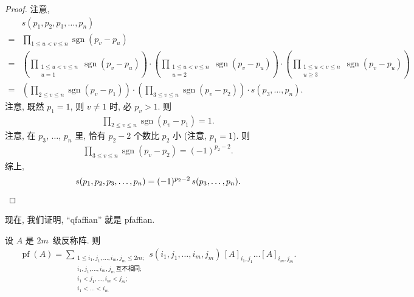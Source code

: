 \documentclass[../libro]{subfiles}
\begin{document}
\begin{proof}
    注意,
    \begin{align*}
             &
        s(p_1, p_2, p_3, \dots, p_n)
        \\
        = {} &
        \prod_{1 \leq u < v \leq n}
        {\operatorname{sgn} {(p_v - p_u)}}
        \\
        = {} &
        \left(
        \prod_{\substack{1 \leq u < v \leq n \\
                u = 1}}
        {\operatorname{sgn} {(p_v - p_u)}}
        \right)
        \cdot
        \left(
        \prod_{\substack{1 \leq u < v \leq n \\
                u = 2}}
        {\operatorname{sgn} {(p_v - p_u)}}
        \right)
        \cdot
        \left(
        \prod_{\substack{1 \leq u < v \leq n \\
                u \geq 3}}
        {\operatorname{sgn} {(p_v - p_u)}}
        \right)
        \\
        = {} &
        \left(
        \prod_{2 \leq v \leq n}
        {\operatorname{sgn} {(p_v - p_1)}}
        \right)
        \cdot
        \left(
        \prod_{3 \leq v \leq n}
        {\operatorname{sgn} {(p_v - p_2)}}
        \right)
        \cdot
        s(p_3, \dots, p_n).
    \end{align*}
    注意, 既然 \(p_1 = 1\),
    则 \(v \neq 1\) 时, 必 \(p_v > 1\).
    则
    \begin{align*}
        \prod_{2 \leq v \leq n}
        {\operatorname{sgn} {(p_v - p_1)}}
        = 1.
    \end{align*}
    注意, 在 \(p_3\), \(\dots\), \(p_n\) 里,
    恰有 \(p_2 - 2\) 个数比 \(p_2\) 小
    (注意, \(p_1 = 1\)).
    则
    \begin{align*}
        \prod_{3 \leq v \leq n}
        {\operatorname{sgn} {(p_v - p_2)}}
        = (-1)^{p_2 - 2}.
    \end{align*}
    综上,
    \begin{equation*}
        s(p_1, p_2, p_3, \dots, p_n)
        = (-1)^{p_2 - 2}\, s(p_3, \dots, p_n).
        \qedhere
    \end{equation*}
\end{proof}

现在, 我们证明, ``qfaffian'' 就是 pfaffian.

\begin{theorem}
    设 \(A\) 是 \(2m\)~级反称阵.
    则
    \begin{align*}
        \operatorname{pf} {(A)}
        = \sum_{\substack{
        1 \leq i_1, j_1, \dots, i_m, j_m \leq 2m; \\
        i_1, j_1, \dots, i_m, j_m\,\text{互不相同};   \\
        i_1 < j_1, \dots, i_m < j_m;              \\
                i_1 < \dots < i_m
            }}
        {s(i_1, j_1, \dots, i_m, j_m)\,
            [A]_{i_1,j_1} \dots [A]_{i_m,j_m}}.
    \end{align*}
\end{theorem}
\end{document}
